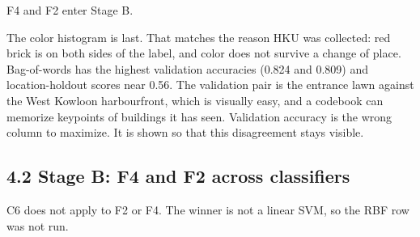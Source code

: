 \documentclass[11pt,a4paper]{article}
\begin{document}
F4 and F2 enter Stage B.

The color histogram is last. That matches the reason HKU was collected: red brick is on both sides of the label, and color does not survive a change of place. Bag-of-words has the highest validation accuracies (0.824 and 0.809) and location-holdout scores near 0.56. The validation pair is the entrance lawn against the West Kowloon harbourfront, which is visually easy, and a codebook can memorize keypoints of buildings it has seen. Validation accuracy is the wrong column to maximize. It is shown so that this disagreement stays visible.

\subsection{4.2 Stage B: F4 and F2 across classifiers}\label{stage-b-f4-and-f2-across-classifiers}

C6 does not apply to F2 or F4. The winner is not a linear SVM, so the RBF row was not run.
\end{document}
